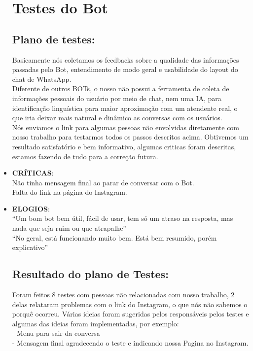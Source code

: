 \begin{itemize}
  
\section{Testes do Bot}
\subsection{Plano de testes:}

    Basicamente nós coletamos os feedbacks sobre a qualidade das informações passadas pelo Bot, entendimento de modo geral e usabilidade do layout do chat de WhatsApp.\\
	Diferente de outros BOTs, o nosso não possui a ferramenta de coleta de informações pessoais do usuário por meio de chat, nem uma IA, para identificação linguística para maior aproximação com um atendente real, o que iria deixar mais natural e dinâmico as conversas com os usuários.\\
	Nós enviamos o link para algumas pessoas não envolvidas diretamente com nosso trabalho para testarmos todos os passos descritos acima. Obtivemos um resultado satisfatório e bem informativo, algumas criticas foram descritas, estamos fazendo de tudo para a correção futura. \\
\item \textbf{CRÍTICAS}: \\
Não tinha mensagem final ao parar de conversar com o Bot. \\
Falta do link na página do Instagram.\\
\item \textbf{ELOGIOS}: \\
“Um bom bot bem útil, fácil de usar, tem só um atraso na resposta, mas nada que seja ruim ou que atrapalhe”\\
“No geral, está funcionando muito bem. Está bem resumido, porém explicativo”

\subsection{Resultado do plano de Testes:}

Foram feitos 8 testes com pessoas não relacionadas com nosso trabalho, 2 delas relataram problemas com o link do Instagram, o que nós não sabemos o porquê ocorreu. Várias ideias foram sugeridas pelos responsáveis pelos testes e algumas das ideias foram implementadas, por exemplo:\\
- Menu para sair da conversa\\
- Mensagem final agradecendo o teste e indicando nossa Pagina no Instagram. \\


\end{itemize}
